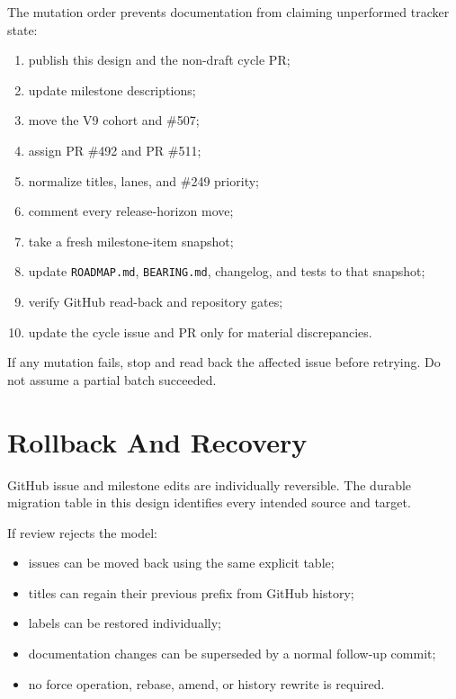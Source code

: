 The mutation order prevents documentation from claiming unperformed tracker state:

\begin{enumerate}
\def\labelenumi{\arabic{enumi}.}
\tightlist
\item
  publish this design and the non-draft cycle PR;
\item
  update milestone descriptions;
\item
  move the V9 cohort and \#507;
\item
  assign PR \#492 and PR \#511;
\item
  normalize titles, lanes, and \#249 priority;
\item
  comment every release-horizon move;
\item
  take a fresh milestone-item snapshot;
\item
  update \texttt{R\allowbreak{}O\allowbreak{}A\allowbreak{}D\allowbreak{}M\allowbreak{}A\allowbreak{}P\allowbreak{}.\allowbreak{}m\allowbreak{}d}, \texttt{B\allowbreak{}E\allowbreak{}A\allowbreak{}R\allowbreak{}I\allowbreak{}N\allowbreak{}G\allowbreak{}.\allowbreak{}m\allowbreak{}d}, changelog, and tests to that snapshot;
\item
  verify GitHub read-back and repository gates;
\item
  update the cycle issue and PR only for material discrepancies.
\end{enumerate}

If any mutation fails, stop and read back the affected issue before retrying. Do not assume a partial batch succeeded.

\section{Rollback And Recovery}\label{record-249-rollback-and-recovery}

GitHub issue and milestone edits are individually reversible. The durable migration table in this design identifies every intended source and target.

If review rejects the model:

\begin{itemize}
\tightlist
\item
  issues can be moved back using the same explicit table;
\item
  titles can regain their previous prefix from GitHub history;
\item
  labels can be restored individually;
\item
  documentation changes can be superseded by a normal follow-up commit;
\item
  no force operation, rebase, amend, or history rewrite is required.
\end{itemize}

